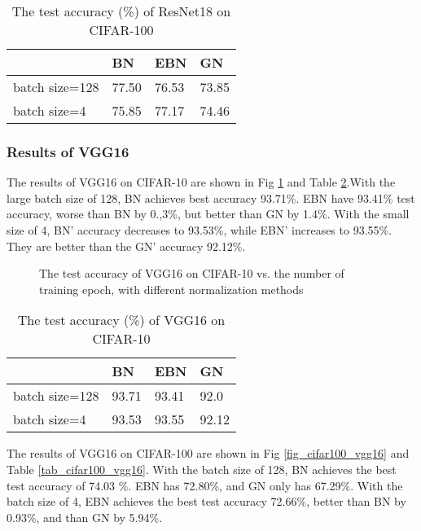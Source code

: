 \documentclass[runningheads]{llncs}
\begin{document}
\begin{table}[!htb]
\caption{The test accuracy (\%) of ResNet18 on CIFAR-100}
\label{tab_cifar100}
\centering
\begin{tabular}{l|lll}
\hline
  & BN & EBN & GN \\
\hline
batch size=128     & 77.50  & 	76.53 & 73.85     \\
batch size=4       & 75.85  & 77.17 & 74.46     \\
\hline
\end{tabular}
\end{table}


\subsubsection{Results of VGG16}

The results of VGG16 on CIFAR-10 are shown in Fig \ref{fig_cifar10_vgg16}  and Table \ref{tab_cifar10_vgg16}.With the large batch size of 128, BN achieves best accuracy 93.71\%. EBN have 93.41\% test accuracy, worse than BN by 0.,3\%, but better than GN by 1.4\%.  
With the small size of 4, BN' accuracy decreases to 93.53\%, while EBN' increases to 93.55\%. They are better than the GN' accuracy 92.12\%.


\begin{figure}[!htb]
\centering
{}
\centering
{}
\caption{The test accuracy of VGG16 on CIFAR-10 vs. the number of training epoch, with different normalization methods}
\label{fig_cifar10_vgg16}
\end{figure}

\begin{table}[!htb]
\caption{The test accuracy (\%) of VGG16 on CIFAR-10}
\label{tab_cifar10_vgg16}
\centering
\begin{tabular}{l|lll}
\hline
  & BN & EBN & GN \\
\hline
batch size=128     & 93.71  & 93.41 & 92.0     \\
batch size=4       & 93.53  & 93.55 & 92.12     \\
\hline
\end{tabular}
\end{table}

The results of VGG16 on CIFAR-100 are shown in Fig \ref{fig_cifar100_vgg16}  and Table \ref{tab_cifar100_vgg16}.
With the batch size of 128, BN achieves the best test accuracy of 74.03 \%. EBN has 72.80\%, and GN  only has 67.29\%. With the batch size of 4, EBN achieves the best test accuracy 72.66\%, better than BN by 0.93\%, and than GN by 5.94\%.
\end{document}
